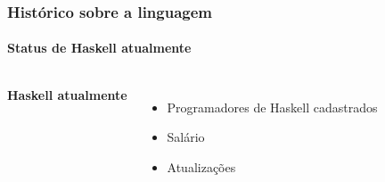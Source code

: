 \begin{frame}
      
    \frametitle{Histórico sobre a linguagem}
    \framesubtitle{Status de Haskell atualmente}

    \begin{columns}
      \textbf{Haskell atualmente} 

      \begin{itemize}
        \item Programadores de Haskell cadastrados 
        \item Salário 
        \item Atualizações
      \end{itemize}


    \end{columns}

\end{frame}

\nocite{haskellmicrosoft}
\nocite{haskellreport2010}
\nocite{haskelljobs}
\nocite{haskellers}